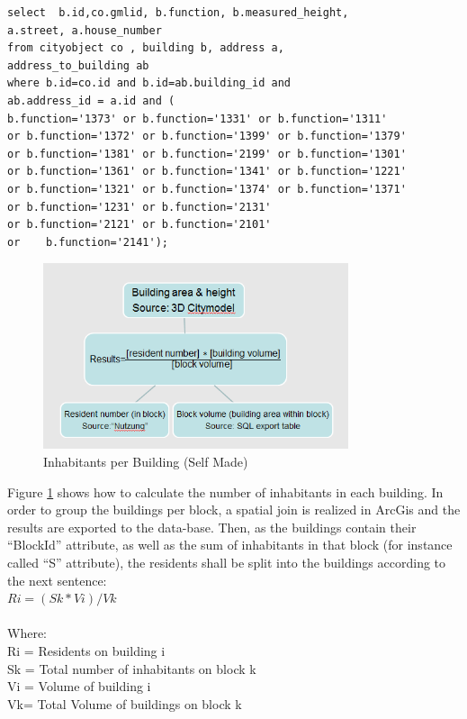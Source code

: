 \documentclass[11pt]{article}
\begin{document}
\begin{lstlisting}
select  b.id,co.gmlid, b.function, b.measured_height,
a.street, a.house_number
from cityobject co , building b, address a, 
address_to_building ab
where b.id=co.id and b.id=ab.building_id and 
ab.address_id = a.id and (
b.function='1373' or b.function='1331' or b.function='1311'
or b.function='1372' or b.function='1399' or b.function='1379'
or b.function='1381' or b.function='2199' or b.function='1301'
or b.function='1361' or b.function='1341' or b.function='1221' 
or b.function='1321' or b.function='1374' or b.function='1371'
or b.function='1231' or b.function='2131'  
or b.function='2121' or b.function='2101'   
or    b.function='2141');
\end{lstlisting}

\begin{figure}[ht]
	\centering
	\includegraphics[width=0.8\textwidth]{fig4.png}
	\caption{Inhabitants per Building (Self Made)}
	\label{fig:figure4}
\end{figure}


Figure \ref{fig:figure4} shows how to calculate the number of inhabitants in each building. In order to group the buildings per block, a spatial join is realized in ArcGis and the results are exported to the data-base. Then, as the buildings contain their “BlockId” attribute, as well as the sum of inhabitants in that block (for instance called “S” attribute), the residents shall be split into the buildings according to the next sentence:\\


$Ri= (Sk*Vi)/Vk$\\
\\
Where:\\
		Ri = Residents on building i\\
		Sk = Total number of inhabitants on block k\\
		Vi = Volume of building i\\
		Vk= Total Volume of buildings on block k
\end{document}

